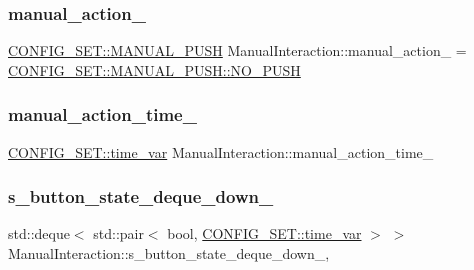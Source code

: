 \subsubsection{\texorpdfstring{manual\+\_\+action\+\_\+}{manual\_action\_}}
{\footnotesize\ttfamily \hyperlink{namespaceCONFIG__SET_a627706be626fd4e58c539ed120c27748}{C\+O\+N\+F\+I\+G\+\_\+\+S\+E\+T\+::\+M\+A\+N\+U\+A\+L\+\_\+\+P\+U\+SH} Manual\+Interaction\+::manual\+\_\+action\+\_\+ = \hyperlink{namespaceCONFIG__SET_a627706be626fd4e58c539ed120c27748a201be4da83bb4099ea70c0fa017f69d5}{C\+O\+N\+F\+I\+G\+\_\+\+S\+E\+T\+::\+M\+A\+N\+U\+A\+L\+\_\+\+P\+U\+S\+H\+::\+N\+O\+\_\+\+P\+U\+SH}\hspace{0.3cm}{\ttfamily [private]}}

\mbox{\label{classManualInteraction_accf9dcfcfad7a49a55c24a317d271eaa}} 
\subsubsection{\texorpdfstring{manual\+\_\+action\+\_\+time\+\_\+}{manual\_action\_time\_}}
{\footnotesize\ttfamily \hyperlink{namespaceCONFIG__SET_a8816a22e7885d027a52bfa0d24fa9008}{C\+O\+N\+F\+I\+G\+\_\+\+S\+E\+T\+::time\+\_\+var} Manual\+Interaction\+::manual\+\_\+action\+\_\+time\+\_\+\hspace{0.3cm}{\ttfamily [private]}}

\mbox{\label{classManualInteraction_ab2a0ebf12ae3ab8cf6149e46406d32f0}} 
\subsubsection{\texorpdfstring{s\+\_\+button\+\_\+state\+\_\+deque\+\_\+down\+\_\+}{s\_button\_state\_deque\_down\_}}
{\footnotesize\ttfamily std\+::deque$<$ std\+::pair$<$ bool, \hyperlink{namespaceCONFIG__SET_a8816a22e7885d027a52bfa0d24fa9008}{C\+O\+N\+F\+I\+G\+\_\+\+S\+E\+T\+::time\+\_\+var} $>$ $>$ Manual\+Interaction\+::s\+\_\+button\+\_\+state\+\_\+deque\+\_\+down\+\_\+\hspace{0.3cm}{\ttfamily [static]}, {\ttfamily [private]}}

